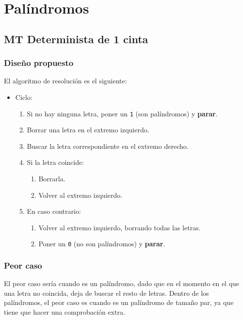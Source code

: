\section{Palíndromos}


\subsection{MT Determinista de 1 cinta}

\subsubsection*{Diseño propuesto}
El algoritmo de resolución es el siguiente:

\begin{itemize}
    \item Ciclo:
    \begin{enumerate}[1.]
        \item Si no hay ninguna letra, poner un \texttt{1} (son palíndromos) y \textbf{parar}.
        \item Borrar una letra en el extremo izquierdo.
        \item Buscar la letra correspondiente en el extremo derecho.
        \item Si la letra coincide:
        \begin{enumerate}[1.]
            \item Borrarla.
            \item Volver al extremo izquierdo.
        \end{enumerate}
        \item En caso contrario:
        \begin{enumerate}[1.]
            \item Volver al extremo izquierdo, borrando todas las letras.
            \item Poner un \texttt{0} (no son palíndromos) y \textbf{parar}.
        \end{enumerate}
    \end{enumerate}
\end{itemize}




\subsubsection*{Peor caso}
El peor caso sería cuando es un palíndromo, dado que en el momento en el que una letra no coincida, deja de buscar el resto de letras. Dentro de los palíndromos, el peor caso es cuando es un palíndromo de tamaño par, ya que tiene que hacer una comprobación extra.

